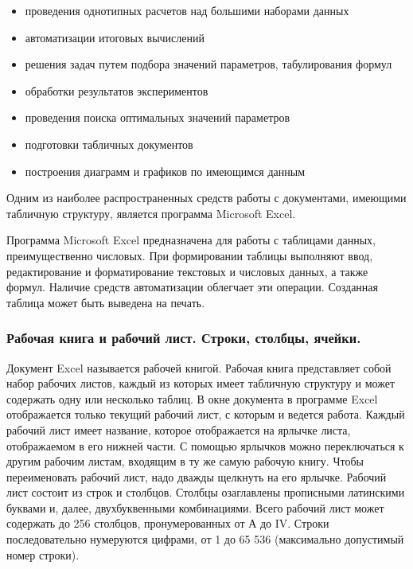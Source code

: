 \begin{itemize}

  \item проведения однотипных расчетов над большими наборами данных
  \item автоматизации итоговых вычислений
  \item решения задач путем подбора значений параметров, табулирования формул
  \item обработки результатов экспериментов
  \item проведения поиска оптимальных значений параметров
  \item подготовки табличных документов
  \item построения диаграмм и графиков по имеющимся данным

\end{itemize}

Одним из наиболее распространенных средств работы с документами, имеющими табличную структуру, является программа Microsoft Excel.

Программа Microsoft Excel предназначена для работы с таблицами данных, преимущественно числовых. При формировании таблицы выполняют ввод, редактирование и форматирование текстовых и числовых данных, а также формул. Наличие средств автоматизации облегчает эти операции. Созданная таблица может быть выведена на печать.

\subsubsection{Рабочая книга и рабочий лист. Строки, столбцы, ячейки.}

Документ Excel называется рабочей книгой. Рабочая книга представляет собой набор рабочих листов, каждый из которых имеет табличную структуру и может содержать одну или несколько таблиц. В окне документа в программе Excel отображается только текущий рабочий лист, с которым и ведется работа. Каждый рабочий лист имеет название, которое отображается на ярлычке листа, отображаемом в его нижней части. С помощью ярлычков можно переключаться к другим рабочим листам, входящим в ту же самую рабочую книгу. Чтобы переименовать рабочий лист, надо дважды щелкнуть на его ярлычке. Рабочий лист состоит из строк и столбцов. Столбцы озаглавлены прописными латинскими буквами и, далее, двухбуквенными комбинациями. Всего рабочий лист может содержать до 256 столбцов, пронумерованных от А до IV. Строки последовательно нумеруются цифрами, от 1 до 65 536 (максимально допустимый номер строки).

